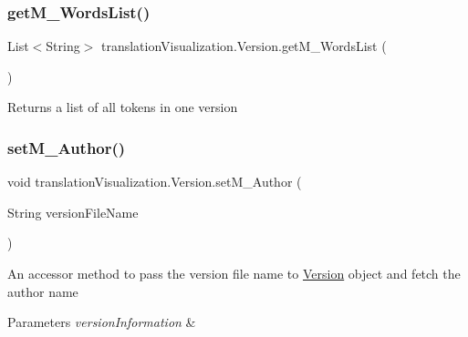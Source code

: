 \subsubsection{\texorpdfstring{get\+M\+\_\+\+Words\+List()}{getM\_WordsList()}}
{\footnotesize\ttfamily List$<$String$>$ translation\+Visualization.\+Version.\+get\+M\+\_\+\+Words\+List (\begin{DoxyParamCaption}{ }\end{DoxyParamCaption})\hspace{0.3cm}{\ttfamily [inline]}}

\begin{DoxyReturn}{Returns}
a list of all tokens in one version 
\end{DoxyReturn}
\mbox{\label{classtranslation_visualization_1_1_version_a01d0c95b99805c6313ec9c32d61566e0}} 
\subsubsection{\texorpdfstring{set\+M\+\_\+\+Author()}{setM\_Author()}}
{\footnotesize\ttfamily void translation\+Visualization.\+Version.\+set\+M\+\_\+\+Author (\begin{DoxyParamCaption}\item[{String}]{version\+File\+Name }\end{DoxyParamCaption})\hspace{0.3cm}{\ttfamily [inline]}}

An accessor method to pass the version file name to \hyperlink{classtranslation_visualization_1_1_version}{Version} object and fetch the author name 
\begin{DoxyParams}{Parameters}
{\em version\+Information} & \\
\hline
\end{DoxyParams}
\mbox{\label{classtranslation_visualization_1_1_version_a3e999218715e8099cb6d5de152b20ef4}} 
